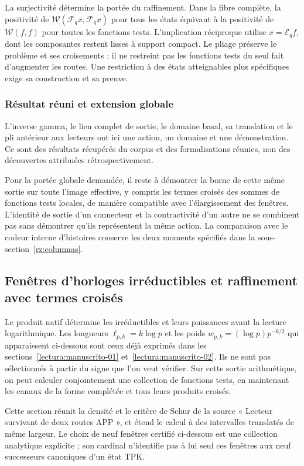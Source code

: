 La surjectivité détermine la portée du raffinement. Dans la fibre complète, la positivité de \(\mathscr W(\mathcal F_qx,\mathcal F_qx)\) pour tous les états équivaut à la positivité de \(\mathscr W(f,f)\) pour toutes les fonctions tests. L’implication réciproque utilise \(x=\mathcal E_qf\), dont les composantes restent lisses à support compact. Le pliage préserve le problème et ses croisements : il ne restreint pas les fonctions tests du seul fait d’augmenter les routes. Une restriction à des états atteignables plus spécifiques exige sa construction et sa preuve.

\subsubsection*{Résultat réuni et extension globale}
L’inverse gamma, le lien complet de sortie, le domaine basal, sa translation et le pli antérieur aux lecteurs ont ici une action, un domaine et une démonstration. Ce sont des résultats récupérés du corpus et des formalisations réunies, non des découvertes attribuées rétrospectivement.

Pour la portée globale demandée, il reste à démontrer la borne de cette même sortie sur toute l'image effective, y compris les termes croisés des sommes de fonctions tests locales, de manière compatible avec l'élargissement des fenêtres. L'identité de sortie d'un connecteur et la contractivité d'un autre ne se combinent pas sans démontrer qu'ils représentent la même action. La comparaison avec le codeur interne d'histoires conserve les deux moments spécifiés dans la sous-section~\ref{rz:columnas}.

\subsection{Fenêtres d’horloges irréductibles et raffinement avec termes croisés}
\label{rz:ventanas}
Le produit natif détermine les irréductibles et leurs puissances avant la lecture logarithmique. Les longueurs \(\ell_{p,k}=k\log p\) et les poids \(w_{p,k}=(\log p)p^{-k/2}\) qui apparaissent ci-dessous sont ceux déjà exprimés dans les sections~\ref{lectura:manuscrito-01} et~\ref{lectura:manuscrito-02}. Ils ne sont pas sélectionnés à partir du signe que l'on veut vérifier. Sur cette sortie arithmétique, on peut calculer conjointement une collection de fonctions tests, en maintenant les canaux de la forme complétée et tous leurs produits croisés.

Cette section réunit la densité et le critère de Schur de la source « Lecteur survivant de deux routes APP », et étend le calcul à des intervalles translatés de même largeur. Le choix de neuf fenêtres certifié ci-dessous est une collection analytique explicite ; son cardinal n'identifie pas à lui seul ces fenêtres aux neuf successeurs canoniques d'un état TPK.

